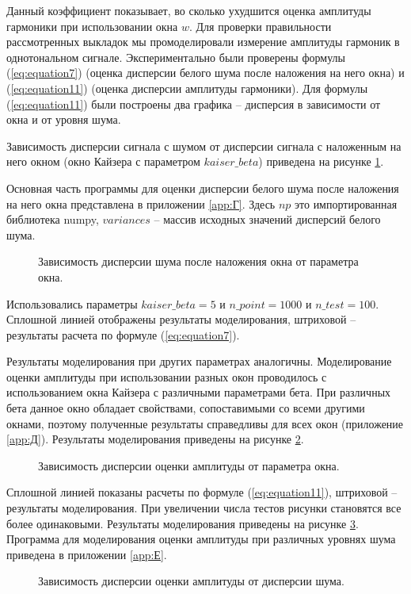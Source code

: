 Данный коэффициент показывает, во сколько ухудшится оценка амплитуды гармоники при использовании окна $w$.
Для проверки правильности рассмотренных выкладок мы промоделировали измерение амплитуды гармоник в однотональном сигнале. Экспериментально были проверены формулы (\ref{eq:equation7}) (оценка дисперсии белого шума после наложения на него окна) и (\ref{eq:equation11}) (оценка дисперсии амплитуды гармоники). Для формулы (\ref{eq:equation11}) были построены два графика -- дисперсия в зависимости от окна и от уровня шума.

Зависимость дисперсии сигнала с шумом от дисперсии сигнала с наложенным на него окном (окно Кайзера с параметром $kaiser\_beta$) приведена на рисунке \ref{img:noise_win_var}.

Основная часть программы для оценки дисперсии белого шума после наложения на него окна представлена в приложении \ref{app:Г}. Здесь $np$ это импортированная библиотека numpy, $variances$ -- массив исходных значений дисперсий белого шума.
\begin{figure}[ht]
	\caption{Зависимость дисперсии шума после наложения окна от параметра окна.}\label{img:noise_win_var}
\end{figure}
Использовались параметры $kaiser\_beta=5$ и $n\_point = 1000$ и $n\_test = 100$.
Сплошной линией отображены результаты моделирования, штриховой -- результаты расчета по формуле (\ref{eq:equation7}).

Результаты моделирования при других параметрах аналогичны. Моделирование оценки амплитуды при использовании разных окон проводилось с использованием окна Кайзера с различными параметрами бета. При различных бета данное окно обладает свойствами, сопоставимыми со всеми другими окнами, поэтому полученные результаты справедливы для всех окон (приложение \ref{app:Д}). 
Результаты моделирования приведены на рисунке \ref{img:estimate_amp_sin_kaiser_beta}. 
\begin{figure}[ht]
	\caption{Зависимость дисперсии оценки амплитуды от параметра окна.}\label{img:estimate_amp_sin_kaiser_beta}
\end{figure}

Сплошной линией показаны расчеты по формуле (\ref{eq:equation11}), штриховой -- результаты моделирования. При увеличении числа тестов рисунки становятся все более одинаковыми. Результаты моделирования приведены на рисунке \ref{img:estimate_amp_sin_kaiser_noise}. Программа для моделирования оценки амплитуды при различных уровнях шума приведена в приложении \ref{app:Е}.
\begin{figure}[ht]
	\caption{Зависимость дисперсии оценки амплитуды от дисперсии шума.}\label{img:estimate_amp_sin_kaiser_noise}
\end{figure}

